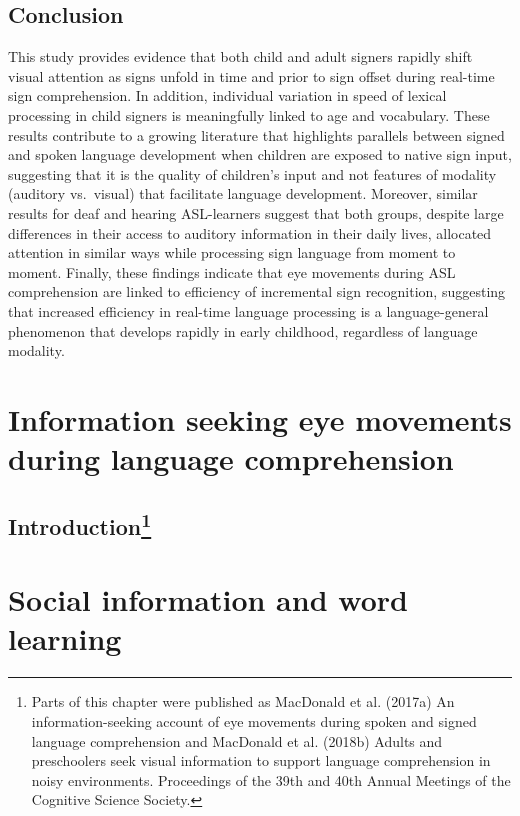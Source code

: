 \documentclass[oneside]{report}
\begin{document}
\hypertarget{conclusion}{%
\section{Conclusion}\label{conclusion}}

This study provides evidence that both child and adult signers rapidly
shift visual attention as signs unfold in time and prior to sign offset
during real-time sign comprehension. In addition, individual variation
in speed of lexical processing in child signers is meaningfully linked
to age and vocabulary. These results contribute to a growing literature
that highlights parallels between signed and spoken language development
when children are exposed to native sign input, suggesting that it is
the quality of children's input and not features of modality (auditory
vs.~visual) that facilitate language development. Moreover, similar
results for deaf and hearing ASL-learners suggest that both groups,
despite large differences in their access to auditory information in
their daily lives, allocated attention in similar ways while processing
sign language from moment to moment. Finally, these findings indicate
that eye movements during ASL comprehension are linked to efficiency of
incremental sign recognition, suggesting that increased efficiency in
real-time language processing is a language-general phenomenon that
develops rapidly in early childhood, regardless of language modality.

\hypertarget{speed-fam}{%
\chapter{Information seeking eye movements during language
comprehension}\label{speed-fam}}

\hypertarget{introduction-2}{%
\section[Introduction]{\texorpdfstring{Introduction\footnote{Parts of
  this chapter were published as MacDonald et al. (2017a) An
  information-seeking account of eye movements during spoken and signed
  language comprehension and MacDonald et al. (2018b) Adults and
  preschoolers seek visual information to support language comprehension
  in noisy environments. Proceedings of the 39th and 40th Annual
  Meetings of the Cognitive Science Society.}}{Introduction}}\label{introduction-2}}

\hypertarget{soc-xsit}{%
\chapter{Social information and word learning}\label{soc-xsit}}
\end{document}
